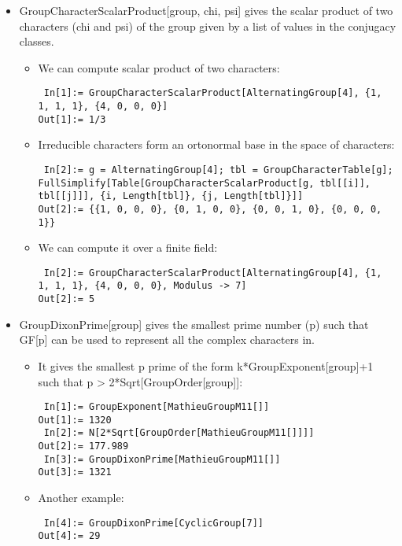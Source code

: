 \begin{itemize}
\item GroupCharacterScalarProduct[group, chi, psi] gives the scalar product of two characters (chi and psi) of the group given by a list of values in the conjugacy classes.
\begin{itemize}
\item We can compute scalar product of two characters:
\begin{lstlisting}
 In[1]:= GroupCharacterScalarProduct[AlternatingGroup[4], {1, 1, 1, 1}, {4, 0, 0, 0}]
Out[1]:= 1/3
\end{lstlisting}
\item Irreducible characters form an ortonormal base in the space of characters:
\begin{lstlisting}
 In[2]:= g = AlternatingGroup[4]; tbl = GroupCharacterTable[g]; FullSimplify[Table[GroupCharacterScalarProduct[g, tbl[[i]], tbl[[j]]], {i, Length[tbl]}, {j, Length[tbl]}]]
Out[2]:= {{1, 0, 0, 0}, {0, 1, 0, 0}, {0, 0, 1, 0}, {0, 0, 0, 1}}
\end{lstlisting}
\item We can compute it over a finite field:
\begin{lstlisting}
 In[2]:= GroupCharacterScalarProduct[AlternatingGroup[4], {1, 1, 1, 1}, {4, 0, 0, 0}, Modulus -> 7]
Out[2]:= 5
\end{lstlisting}
\end{itemize}

\item GroupDixonPrime[group] gives the smallest prime number (p) such that GF[p] can be used to represent all the complex characters in.
\begin{itemize}
\item It gives the smallest p prime of the form k*GroupExponent[group]+1 such that p > 2*Sqrt[GroupOrder[group]]:
\begin{lstlisting}
 In[1]:= GroupExponent[MathieuGroupM11[]]
Out[1]:= 1320
 In[2]:= N[2*Sqrt[GroupOrder[MathieuGroupM11[]]]]
Out[2]:= 177.989
 In[3]:= GroupDixonPrime[MathieuGroupM11[]]
Out[3]:= 1321
\end{lstlisting}
\item Another example:
\begin{lstlisting}
 In[4]:= GroupDixonPrime[CyclicGroup[7]]
Out[4]:= 29
\end{lstlisting}
\end{itemize}


\end{itemize}

